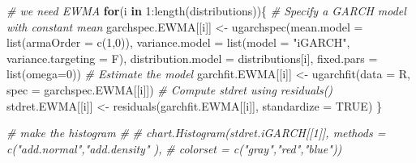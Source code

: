 \documentclass[a4paper, twoside]{templates/ociamthesis}
\newenvironment{Shaded}{\begin{snugshade}}{\end{snugshade}}
\newcommand{\AttributeTok}[1]{\textcolor[rgb]{0.77,0.63,0.00}{#1}}
\newcommand{\CommentTok}[1]{\textcolor[rgb]{0.56,0.35,0.01}{\textit{#1}}}
\newcommand{\ConstantTok}[1]{\textcolor[rgb]{0.00,0.00,0.00}{#1}}
\newcommand{\ControlFlowTok}[1]{\textcolor[rgb]{0.13,0.29,0.53}{\textbf{#1}}}
\newcommand{\DecValTok}[1]{\textcolor[rgb]{0.00,0.00,0.81}{#1}}
\newcommand{\FunctionTok}[1]{\textcolor[rgb]{0.00,0.00,0.00}{#1}}
\newcommand{\NormalTok}[1]{#1}
\newcommand{\OtherTok}[1]{\textcolor[rgb]{0.56,0.35,0.01}{#1}}
\newcommand{\SpecialCharTok}[1]{\textcolor[rgb]{0.00,0.00,0.00}{#1}}
\newcommand{\StringTok}[1]{\textcolor[rgb]{0.31,0.60,0.02}{#1}}
\renewenvironment{Shaded}
{
  \vspace{10pt}%
  \begin{snugshade}%
}{%
  \end{snugshade}%
  \vspace{8pt}%
}
\begin{document}
\begin{Shaded}
\begin{Highlighting}[]
\CommentTok{\# we need EWMA}
\ControlFlowTok{for}\NormalTok{(i }\ControlFlowTok{in} \DecValTok{1}\SpecialCharTok{:}\FunctionTok{length}\NormalTok{(distributions))\{}
\CommentTok{\# Specify a GARCH model with constant mean}
\NormalTok{garchspec.EWMA[[i]] }\OtherTok{\textless{}{-}} \FunctionTok{ugarchspec}\NormalTok{(}\AttributeTok{mean.model =} \FunctionTok{list}\NormalTok{(}\AttributeTok{armaOrder =} \FunctionTok{c}\NormalTok{(}\DecValTok{1}\NormalTok{,}\DecValTok{0}\NormalTok{)),}
                     \AttributeTok{variance.model =} \FunctionTok{list}\NormalTok{(}\AttributeTok{model =} \StringTok{"iGARCH"}\NormalTok{, }\AttributeTok{variance.targeting =}\NormalTok{ F),}
                     \AttributeTok{distribution.model =}\NormalTok{ distributions[i], }\AttributeTok{fixed.pars =} \FunctionTok{list}\NormalTok{(}\AttributeTok{omega=}\DecValTok{0}\NormalTok{))}
\CommentTok{\# Estimate the model}
\NormalTok{garchfit.EWMA[[i]] }\OtherTok{\textless{}{-}} \FunctionTok{ugarchfit}\NormalTok{(}\AttributeTok{data =}\NormalTok{ R, }\AttributeTok{spec =}\NormalTok{ garchspec.EWMA[[i]])}
\CommentTok{\# Compute stdret using residuals()}
\NormalTok{stdret.EWMA[[i]] }\OtherTok{\textless{}{-}} \FunctionTok{residuals}\NormalTok{(garchfit.EWMA[[i]], }\AttributeTok{standardize =} \ConstantTok{TRUE}\NormalTok{)}
\NormalTok{\}}


\CommentTok{\#  make the histogram}
\CommentTok{\# }
\CommentTok{\# chart.Histogram(stdret.iGARCH[[1]], methods = c("add.normal","add.density" ),}
\CommentTok{\#                 colorset = c("gray","red","blue"))}
\end{Highlighting}
\end{Shaded}
\end{document}
